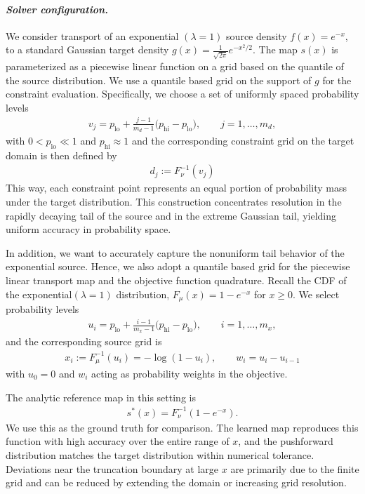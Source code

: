 \documentclass[12pt,leqno]{amsart}
\begin{document}
\paragraph{\it Solver configuration.}
We consider transport of an exponential $(\lambda=1)$ source density $f(x)=e^{-x}$, to a standard Gaussian target density $g(x) = \frac{1}{\sqrt{2\pi}}e^{-x^2/2}$. The map $s(x)$ is parameterized as a piecewise linear function on a grid based on the quantile of the source distribution. We use a quantile based grid on the support of $g$ for the constraint evaluation. Specifically, we choose a set of uniformly spaced probability levels
\begin{align*}
v_j = p_{\mathrm{lo}} +
\frac{j-1}{m_d-1}\bigl(p_{\mathrm{hi}}-p_{\mathrm{lo}}\bigr),
\qquad j=1,\ldots,m_d,    
\end{align*}
with $0<p_{\mathrm{lo}}\ll 1$ and $p_{\mathrm{hi}}\approx 1$ and the corresponding constraint grid on the target domain is then defined by
\begin{align*}
d_j := F_{\nu}^{-1}(v_j)
\end{align*}
This way, each constraint point represents an equal portion of probability mass
under the target distribution. This construction concentrates resolution in the rapidly decaying tail of the source and in the extreme Gaussian tail, yielding uniform accuracy in probability space. 

In addition, we want to accurately capture the nonuniform tail behavior of the exponential source. Hence, we also adopt a quantile based grid for the piecewise linear transport map and the objective function quadrature. Recall the CDF of the exponential$(\lambda=1)$
distribution, $F_{\mu}(x) = 1-e^{-x}$ for $x \ge 0$. We select probability levels
\begin{align*}
u_i = p_{\mathrm{lo}} +
\frac{i-1}{m_x-1}\bigl(p_{\mathrm{hi}}-p_{\mathrm{lo}}\bigr),
\qquad i=1,\ldots,m_x ,
\end{align*}
and the corresponding source grid is
\begin{align*}
x_i := F_{\mu}^{-1}(u_i) = -\log(1-u_i),
\qquad w_i = u_{i}-u_{i-1}
\end{align*}
with $u_0 =0$ and  $w_i$ acting as probability weights in the objective.

The analytic reference map in this setting is
\begin{align*}
s^*(x)=F_{\nu}^{-1}(1-e^{-x}).
\end{align*}
We use this as the ground truth for comparison. The learned map reproduces this function with high accuracy over the entire range of $x$, and the pushforward distribution matches the target distribution within numerical tolerance. Deviations near the truncation boundary at large $x$ are primarily due to the finite grid and can be reduced by extending the domain or increasing grid resolution.
\end{document}
